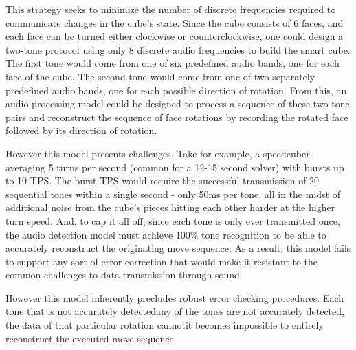 This strategy seeks to minimize the number of discrete frequencies required to communicate changes in the cube's state. Since the cube consists of 6 faces, and each face can be turned either clockwise or counterclockwise, one could design a two-tone protocol using only 8 discrete audio frequencies to build the smart cube. The first tone would come from one of six predefined audio bands, one for each face of the cube. The second tone would come from one of two separately predefined audio bands, one for each possible direction of rotation. From this, an audio processing model could be designed to process a sequence of these two-tone pairs and reconstruct the sequence of face rotations by recording the rotated face followed by its direction of rotation.

However this model presents challenges. Take for example, a speedcuber averaging 5 turns per second (common for a 12-15 second solver) with bursts up to 10 TPS. The burst TPS would require the successful transmission of 20 sequential tones within a single second - only 50ms per tone, all in the midst of additional noise from the cube's pieces hitting each other harder at the higher turn speed. And, to cap it all off, since each tone is only ever transmitted once, the audio detection model must achieve 100\% tone recognition to be able to accurately reconstruct the originating move sequence. As a result, this model fails to support any sort of error correction that would make it resistant to the common challenges to data transmission through sound.

However this model inherently precludes robust error checking procedures. Each tone that is not accurately detectedany of the tones are not accurately detected, the data of that particular rotation cannotit becomes impossible to entirely reconstruct the executed move sequence



